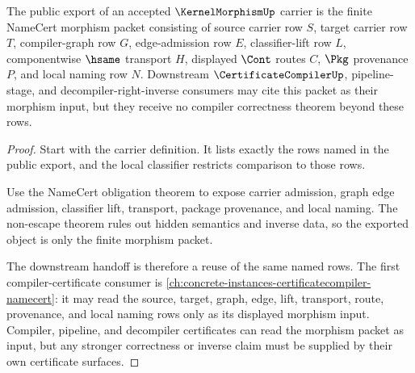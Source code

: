 \begin{theorem}
\label{thm:kernel-morphism-public-export}
The public export of an accepted $\KernelMorphismUp$ carrier is the finite NameCert morphism packet consisting of source carrier row $S$, target carrier row $T$, compiler-graph row $G$, edge-admission row $E$, classifier-lift row $L$, componentwise $\hsame$ transport $H$, displayed $\Cont$ routes $C$, $\Pkg$ provenance $P$, and local naming row $N$. Downstream $\CertificateCompilerUp$, pipeline-stage, and decompiler-right-inverse consumers may cite this packet as their morphism input, but they receive no compiler correctness theorem beyond these rows.
\end{theorem}
\begin{proof}
Start with the carrier definition. It lists exactly the rows named in the public export, and the local classifier restricts comparison to those rows.

Use the NameCert obligation theorem to expose carrier admission, graph edge admission, classifier lift, transport, package provenance, and local naming. The non-escape theorem rules out hidden semantics and inverse data, so the exported object is only the finite morphism packet.

The downstream handoff is therefore a reuse of the same named rows. The first compiler-certificate consumer is \autoref{ch:concrete-instances-certificatecompiler-namecert}: it may read the source, target, graph, edge, lift, transport, route, provenance, and local naming rows only as its displayed morphism input. Compiler, pipeline, and decompiler certificates can read the morphism packet as input, but any stronger correctness or inverse claim must be supplied by their own certificate surfaces.
\end{proof}

